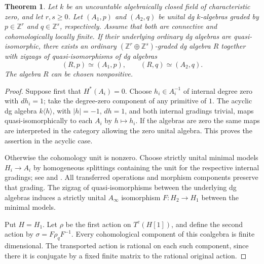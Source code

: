 \documentclass[12pt,a4paper,english,reqno]{amsart}
\theoremstyle{plain}
\newtheorem{thm}{Theorem}[section]
\theoremstyle{definition}
\numberwithin{equation}{section}
\def\ro{\rho}
\def\si{\sigma}
\def\bbZ{{\mathbb Z}}
\def\ds{\oplus}
\def\Ainf{A_\infty}
\begin{document}
\begin{thm}\label{thm:common-dg}
Let $k$ be an uncountable algebraically closed field of characteristic zero, and let $r,s\geq0$. Let $(A_1,p)$ and $(A_2,q)$ be unital dg $k$-algebras graded by $p\in\bbZ^r$ and $q\in\bbZ^s$, respectively. Assume that both are connective and cohomologically locally finite. If their underlying ordinary dg algebras are quasi-isomorphic, there exists an ordinary $(\bbZ^r\ds\bbZ^s)$-graded dg algebra $R$ together with zigzags of quasi-isomorphisms of dg algebras
\[
 (R,p)\simeq(A_1,p),\qquad (R,q)\simeq(A_2,q).
\]
The algebra $R$ can be chosen nonpositive.
\end{thm}
\begin{proof}
Suppose first that $H^*(A_i)=0$. Choose $h_i\in A_i^{-1}$ of internal degree zero with $dh_i=1$; take the degree-zero component of any primitive of $1$. The acyclic dg algebra $k\langle h\rangle$, with $|h|=-1$, $dh=1$, and both internal gradings trivial, maps quasi-isomorphically to each $A_i$ by $h\mapsto h_i$. If the algebras are zero the same maps are interpreted in the category allowing the zero unital algebra. This proves the assertion in the acyclic case.

Otherwise the cohomology unit is nonzero. Choose strictly unital minimal models $H_i\to A_i$ by homogeneous splittings containing the unit for the respective internal gradings; see \cite[Sections 3.3 and 8.1]{KellerAinf} and \cite[Section 1.1]{COS}. All transferred operations and morphism components preserve that grading. The zigzag of quasi-isomorphisms between the underlying dg algebras induces a strictly unital $\Ainf$ isomorphism $F:H_2\to H_1$ between the minimal models.

Put $H=H_1$. Let $\ro$ be the first action on $T^c(H[1])$, and define the second action by $\si=F\ro_qF^{-1}$. Every cohomological component of this coalgebra is finite dimensional. The transported action is rational on each such component, since there it is conjugate by a fixed finite matrix to the rational original action.


\end{proof}
\end{document}
